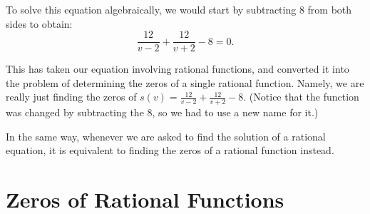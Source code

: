 \documentclass[nooutcomes]{ximera}
\begin{document}
	To solve this equation algebraically, we would start by subtracting $8$ from both sides to obtain:
	\[ \frac{12}{v-2}+\frac{12}{v+2}-8 = 0. \]
	
	This has taken our equation involving rational functions, and converted it into the problem of determining the zeros of a single rational function. 
	Namely, we are really just finding the zeros of $s(v) = \frac{12}{v-2}+\frac{12}{v+2}-8$. 
	(Notice that the function was changed by subtracting the $8$, so we had to use a new name for it.)
	
	In the same way, whenever we are asked to find the solution of a rational equation, it is equivalent to finding the zeros of a rational function instead.



\section{Zeros of Rational Functions}
\end{document}
